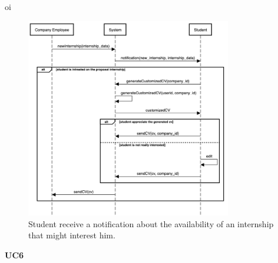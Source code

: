oi
    \begin{figure}[H]
        \centering
        \includegraphics[width=0.8\textwidth]{RASD/Assets/SequenceDiagrams/5-student-receives-a-notification.png}
        \caption{Student receive a notification about the availability of an internship that might interest him.}
        \label{fig:Student receive a notification about the availability of an internship that might interest him}
    \end{figure}

    \textbf{UC6}
    
